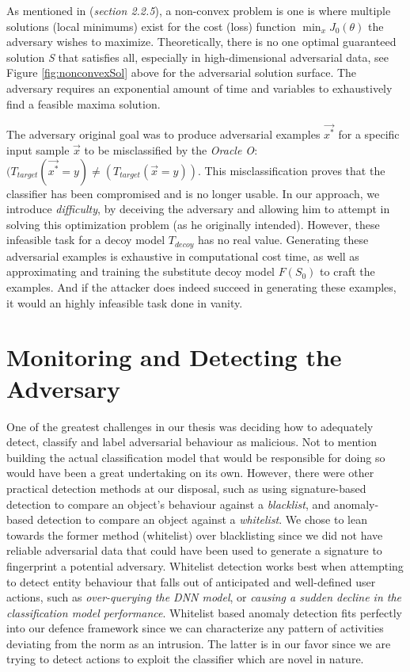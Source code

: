 \documentclass[grad,lot,lof,11pt,oneside,onehalfspace]{RUthesis}
\begin{document}
As mentioned in (\textit{section 2.2.5}), a non-convex problem is one is where multiple solutions (local minimums) exist for the cost (loss) function $\min_{x} J_{0}(\theta)$ the adversary wishes to maximize. Theoretically, there is no one optimal guaranteed solution \textit{S} that satisfies all, especially in high-dimensional adversarial data, see Figure \ref {fig:nonconvexSol} above for the adversarial solution surface. The adversary requires an exponential amount of time and variables to exhaustively find a feasible maxima solution. 

The adversary original goal was to produce adversarial examples \textit{$\vec{x^{*}}$} for a specific input sample $\vec{x}$ to be misclassified by the \textit{Oracle O}: \textit{$(T_{target}(\textit{$\vec{x^{*}}$}=y) \neq (T_{target}(\textit{$\vec{x}$}=y))$}. This misclassification proves that the classifier has been compromised and is no longer usable. In our approach, we introduce \textit{difficulty}, by deceiving the adversary and allowing him to attempt in solving this optimization problem (as he originally intended). However, these infeasible task for a decoy model \textit{$T_{decoy}$} has no real value. Generating these adversarial examples is exhaustive in computational cost time, as well as approximating and training the substitute decoy model \textit{$F(S_{0})$} to craft the examples. And if the attacker does indeed succeed in generating these examples, it would an highly infeasible task done in vanity. 
\section{Monitoring and Detecting the Adversary}
One of the greatest challenges in our thesis was deciding how to adequately detect, classify and label adversarial behaviour as malicious. Not to mention building the actual classification model that would be responsible for doing so would have been a great undertaking on its own. However, there were other practical detection methods at our disposal, such as using signature-based detection to compare an object's behaviour against a \textit{blacklist}, and anomaly-based detection to compare an object against a \textit{whitelist}. We chose to lean towards the former method (whitelist) over blacklisting since we did not have reliable adversarial data that could have been used to generate a signature to fingerprint a potential adversary. Whitelist detection works best when attempting to detect entity behaviour that falls out of anticipated and well-defined user actions, such as \textit{over-querying the DNN model}, or \textit{causing a sudden decline in the classification model performance}. Whitelist based anomaly detection fits perfectly into our defence framework since we can characterize any pattern of activities deviating from the norm as an intrusion. The latter is in our favor since we are trying to detect actions to exploit the classifier which are novel in nature.  
\end{document}
